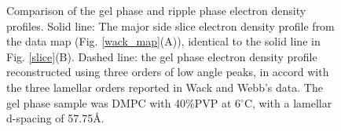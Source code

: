 \pagebreak

\begin{figure}
\begin{center}
\leavevmode
{}
\end{center}
\caption{Comparison of the gel phase and ripple phase electron density
profiles. Solid line: The major side slice electron density profile
from the data map (Fig. \ref{wack_map}(A)), identical to the solid line
in Fig. \ref{slice}(B). Dashed line: the gel phase electron density
profile reconstructed using three orders of low angle peaks, in accord
with the three lamellar orders reported in Wack and Webb's data. The gel
phase sample was DMPC with 40\%PVP at 6$^{\circ}$C, with a lamellar
d-spacing of 57.75\AA. 
\label{gel_rppl}}
\end{figure}

\pagebreak

